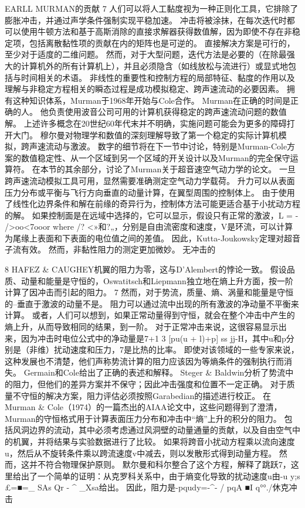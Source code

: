 \documentclass[UTF8,11pt,a4paper,openany,fontset=fandol]{ctexbook}
\begin{document}
EARLL MURMAN的贡献 7 人们可以将人工黏度视为一种正则化工具，它排除了膨胀冲击，并通过声学条件强制实现平稳加速。 冲击将被涂抹，在每次迭代时都可以使用牛顿方法和基于高斯消除的直接求解器获得数值解，因为即使不存在非稳定项，包括离散黏性项的贡献在内的矩阵也是可逆的。 直接解决方案是可行的，至少对于适度的二维问题。 然而，对于大型问题，迭代方法是必要的（在除最强大的计算机外的所有计算机上），并且必须隐含（如线放松与流进行）或显式地包括与时间相关的术语。 非线性的重要性和控制方程的局部特征、黏度的作用以及理解与非稳定方程相关的瞬态过程是成功模拟稳定、跨声速流动的必要因素。 拥有这种知识体系，Murman于1968年开始与Cole合作。 Murman在正确的时间是正确的人。 他负责使用波音公司可用的计算机获得稳定的跨声速流动问题的数值解。 上述许多概念在20世纪60年代末并不明确，实施问题可能会为更多的障碍打开大门。 穆尔曼对物理学和数值的深刻理解导致了第一个稳定的实际计算机模拟，跨声速流动与激波。 数字的细节将在下一节中讨论，特别是Murman-Cole方案的数值稳定性、从一个区域到另一个区域的开关设计以及Murman的完全保守运算符。 在本节的其余部分，讨论了Murman关于超音速空气动力学的论文。 一旦跨声速流动模拟工具可用，显然需要准确测定空气动力学载荷。 升力可以从表面压力分布或平衡与飞行方向垂直的动量计算，在翼型周围的控制体上。 由于使用了线性化边界条件和解在前缘的奇异行为，控制体方法可能更适合基于小扰动方程的解。 如果控制面是在远域中选择的，它可以显示，假设只有正常的激波，L = - />oo<7ooor where /? <»和?„，分别是自由流密度和速度，V是环流，可以计算为尾缘上表面和下表面的电位值之间的差值。 因此，Kutta-Joukowsky定理对超音子流有效。 然而，非黏性阻力的测定更加微妙。 无冲击的

8 HAFEZ \& CAUGHEY机翼的阻力为零，这与D'Alembert的悖论一致。 假设品质、动量和能量是守恒的，Oswatitsch和Liepmann独立地在熵上升方面，按一阶计算了因冲击而引起的阻力。 7 然而，对于势流，质量、熵、涡量和能量是守恒的--垂直于激波的动量不是。 阻力可以通过流中出现的所有激波的净动量不平衡来计算。 或者，人们可以想到，如果正常动量得到守恒，就会在整个冲击中产生的熵上升，从而导致相同的结果，到一阶。 对于正常冲击来说，这很容易显示出来，因为冲击时电位公式中的净动量是7+1 3 [pu(u + l)+p] ss jj-H，其中u和p分别是（非维）扰动速度和压力，7是比热的比率。 即使对该领域的一些专家来说，这种发展也不清楚，他们声称势流计算的阻力应该因为等熵条件的强制执行而消失。 Germain和Cole给出了正确的表述和解释。 Steger \& Baldwin分析了势流中的阻力，但他们的差异方案并不保守；因此冲击强度和位置不一定正确。 对于质量不守恒的解决方案，阻力评估必须按照Garabedian的描述进行校正。 在Murman \& Cole（1974）的一篇杰出的AIAA论文中，这些问题得到了澄清，Murman的守恒格式用于计算表面压力分布和冲击中“熵”上升的积分的阻力。 包括风洞边界的流动，其中必须考虑通过风洞壁的动量通量的贡献，以及自由空气中的机翼，并将结果与实验数据进行了比较。 如果将跨音小扰动方程乘以流向速度u，然后从不旋转条件乘以跨流速度v中减去，则以发散形式得到动量方程。 然而，这并不符合物理保护原则。 默尔曼和科尔整合了这个方程，解释了跳跃7，这里给出了一个简单的证明：从克罗科关系中，由于熵变化导致的扰动速度u由-u y;s £=■=\_ SAs Qr - \textasciicircum{} \_Xsa给出。 因此，阻力是-pqudy=-\textasciicircum{}- / pqA ■I q°°./休克冲击
\end{document}
